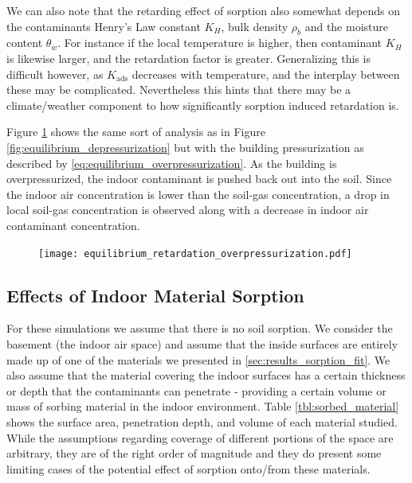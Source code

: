 We can also note that the retarding effect of sorption also somewhat depends on the contaminants Henry's Law constant $K_H$, bulk density $\rho_b$ and the moisture content $\theta_w$.
For instance if the local temperature is higher, then contaminant $K_H$ is likewise larger, and the retardation factor is greater.
Generalizing this is difficult however, as $K_\mathrm{ads}$ decreases with temperature, and the interplay between these may be complicated.
Nevertheless this hints that there may be a climate/weather component to how significantly sorption induced retardation is.\par

Figure \ref{fig:equilibrium_overpressurization} shows the same sort of analysis as in Figure \ref{fig:equilibrium_depressurization} but with the building pressurization as described by \eqref{eq:equilibrium_overpressurization}.
As the building is overpressurized, the indoor contaminant is pushed back out into the soil.
Since the indoor air concentration is lower than the soil-gas concentration, a drop in local soil-gas concentration is observed along with a decrease in indoor air contaminant concentration.\par

\begin{figure}[!htb]
  \texttt{[image: equilibrium\_retardation\_overpressurization.pdf]}
  \caption{}
  \label{fig:equilibrium_overpressurization}
\end{figure}


\subsection{Effects of Indoor Material Sorption}\label{sec:results_indoor_sorption}

For these simulations we assume that there is no soil sorption.
We consider the basement (the indoor air space) and assume that the inside surfaces are entirely made up of one of the materials we presented in \ref{sec:results_sorption_fit}.
We also assume that the material covering the indoor surfaces has a certain thickness or depth that the contaminants can penetrate - providing a certain volume or mass of sorbing material in the indoor environment.
Table \ref{tbl:sorbed_material} shows the surface area, penetration depth, and volume of each material studied.
While the assumptions regarding coverage of different portions of the space are arbitrary, they are of the right order of magnitude and they do present some limiting cases of the potential effect of sorption onto/from these materials.\par

